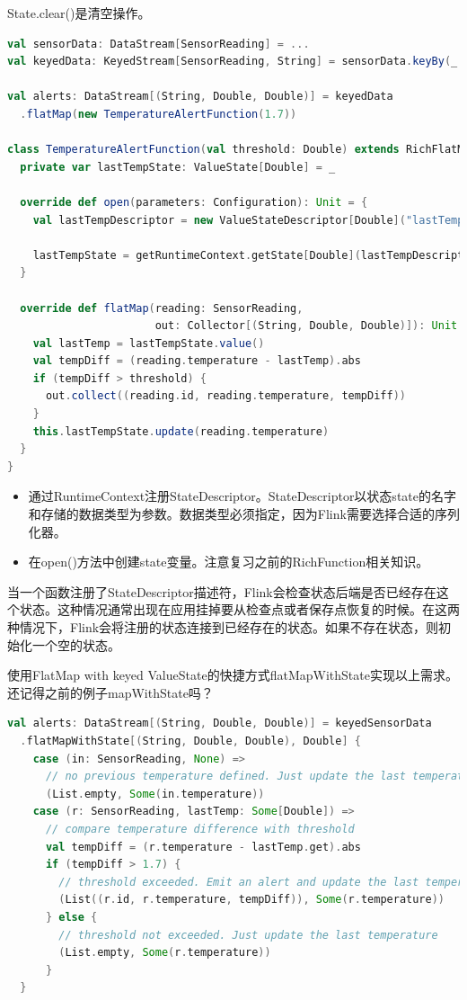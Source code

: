 \documentclass[oneside]{ctexbook}
\begin{document}
State.clear()是清空操作。

\begin{lstlisting}[language=scala]
val sensorData: DataStream[SensorReading] = ...
val keyedData: KeyedStream[SensorReading, String] = sensorData.keyBy(_.id)

val alerts: DataStream[(String, Double, Double)] = keyedData
  .flatMap(new TemperatureAlertFunction(1.7))

class TemperatureAlertFunction(val threshold: Double) extends RichFlatMapFunction[SensorReading, (String, Double, Double)] {
  private var lastTempState: ValueState[Double] = _

  override def open(parameters: Configuration): Unit = {
    val lastTempDescriptor = new ValueStateDescriptor[Double]("lastTemp", classOf[Double])

    lastTempState = getRuntimeContext.getState[Double](lastTempDescriptor)
  }

  override def flatMap(reading: SensorReading,
                       out: Collector[(String, Double, Double)]): Unit = {
    val lastTemp = lastTempState.value()
    val tempDiff = (reading.temperature - lastTemp).abs
    if (tempDiff > threshold) {
      out.collect((reading.id, reading.temperature, tempDiff))
    }
    this.lastTempState.update(reading.temperature)
  }
}
\end{lstlisting}

\begin{itemize}
\item 通过RuntimeContext注册StateDescriptor。StateDescriptor以状态state的名字和存储的数据类型为参数。数据类型必须指定，因为Flink需要选择合适的序列化器。
\item 在open()方法中创建state变量。注意复习之前的RichFunction相关知识。
\end{itemize}

当一个函数注册了StateDescriptor描述符，Flink会检查状态后端是否已经存在这个状态。这种情况通常出现在应用挂掉要从检查点或者保存点恢复的时候。在这两种情况下，Flink会将注册的状态连接到已经存在的状态。如果不存在状态，则初始化一个空的状态。

使用FlatMap with keyed ValueState的快捷方式flatMapWithState实现以上需求。还记得之前的例子mapWithState吗？

\begin{lstlisting}[language=scala]
val alerts: DataStream[(String, Double, Double)] = keyedSensorData
  .flatMapWithState[(String, Double, Double), Double] {
    case (in: SensorReading, None) =>
      // no previous temperature defined. Just update the last temperature
      (List.empty, Some(in.temperature))
    case (r: SensorReading, lastTemp: Some[Double]) =>
      // compare temperature difference with threshold
      val tempDiff = (r.temperature - lastTemp.get).abs
      if (tempDiff > 1.7) {
        // threshold exceeded. Emit an alert and update the last temperature
        (List((r.id, r.temperature, tempDiff)), Some(r.temperature))
      } else {
        // threshold not exceeded. Just update the last temperature
        (List.empty, Some(r.temperature))
      }
  }
\end{lstlisting}
\end{document}
